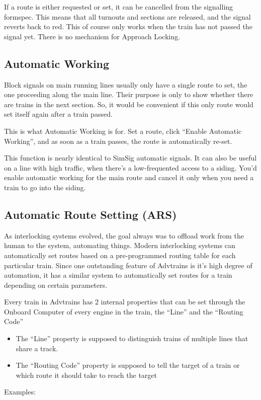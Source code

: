 \documentclass[english]{paper}
\begin{document}
If a route is either requested or set, it can be cancelled from the
signalling formspec. This means that all turnouts and sections are
released, and the signal reverts back to red. This of course only
works when the train has not passed the signal yet. There is no mechanism
for Approach Locking.

\subsection{Automatic Working}

Block signals on main running lines usually only have a single route
to set, the one proceeding along the main line. Their purpose is only
to show whether there are trains in the next section. So, it would
be convenient if this only route would set itself again after a train
passed.

This is what Automatic Working is for. Set a route, click ``Enable
Automatic Working'', and as soon as a train passes, the route is
automatically re-set.

This function is nearly identical to SimSig automatic signals. It
can also be useful on a line with high traffic, when there's a low-frequented
access to a siding. You'd enable automatic working for the main route
and cancel it only when you need a train to go into the siding.

\subsection{Automatic Route Setting (ARS)}

As interlocking systems evolved, the goal always was to offload work
from the human to the system, automating things. Modern interlocking
systems can automatically set routes based on a pre-programmed routing
table for each particular train. Since one outstanding feature of
Advtrains is it's high degree of automation, it has a similar system
to automatically set routes for a train depending on certain parameters.

Every train in Advtrains has 2 internal properties that can be set
through the Onboard Computer of every engine in the train, the ``Line''
and the ``Routing Code''
\begin{itemize}
\item The ``Line'' property is supposed to distinguish trains of multiple
lines that share a track.
\item The ``Routing Code'' property is supposed to tell the target of
a train or which route it should take to reach the target
\end{itemize}
Examples:
\end{document}
